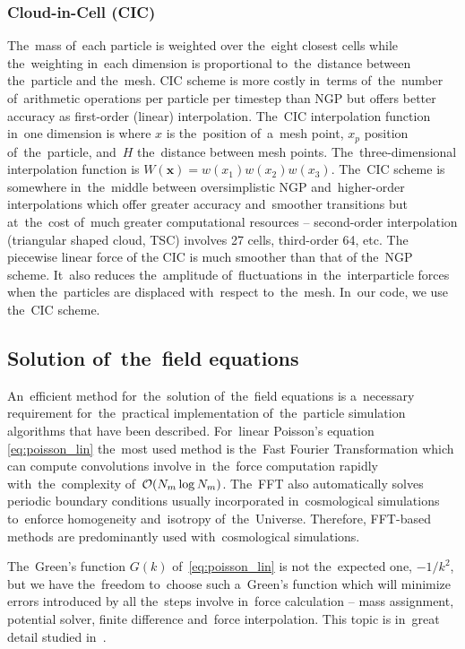 \subsubsection{Cloud-in-Cell (CIC)}
The~mass of~each particle is weighted over the~eight closest cells while the~weighting in~each dimension is proportional to~the~distance between the~particle and the~mesh. CIC scheme is more costly in~terms of~the~number of~arithmetic operations per particle per timestep than NGP but offers better accuracy as first-order (linear) interpolation. The~CIC interpolation function in~one dimension is
where $x$ is the~position of~a~mesh point, $x_p$ position of~the~particle, and~$H$ the~distance between mesh points. The~three-dimensional interpolation function is \(W(\mathbf x)=w(x_1)w(x_2)w(x_3)\). The~CIC scheme is somewhere in~the~middle between oversimplistic NGP and~higher-order interpolations which offer greater accuracy and~smoother transitions but at~the~cost of~much greater computational resources -- second-order interpolation (triangular shaped cloud, TSC) involves 27 cells, third-order 64, etc. The piecewise linear force of the CIC is much smoother than that of the~NGP scheme. It~also reduces the~amplitude of~fluctuations in~the~interparticle forces when the~particles are displaced with~respect to~the~mesh. In~our code, we use the~CIC scheme.

\subsection{Solution of~the~field equations}
An~efficient method for~the~solution of~the~field equations is a~necessary requirement for~the~practical implementation of~the~particle simulation algorithms that have been described. For~linear Poisson’s equation \eqref{eq:poisson_lin} the~most used method is the~Fast Fourier Transformation which can compute convolutions involve in~the~force computation rapidly with~the~complexity of~$\mathcal{O}(N_m\log N_m)$. The~FFT also automatically solves periodic boundary conditions usually incorporated in~cosmological simulations to~enforce homogeneity and~isotropy of~the~Universe. Therefore, FFT-based methods are predominantly used with~cosmological simulations.

The~Green's function $G(k)$ of~\eqref{eq:poisson_lin} is not the~expected one, $-1/k^2$, but we have the~freedom to~choose such a~Green's function which will minimize errors introduced by all the~steps involve in~force calculation -- mass assignment, potential solver, finite difference and~force interpolation. This topic is in~great detail studied in~\textcite{Hockney:1988:CSU:62815}.
